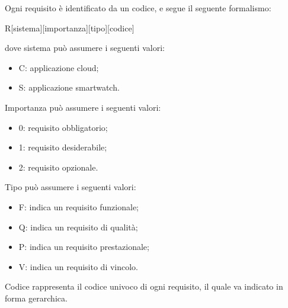 Ogni requisito è identificato da un codice, e segue il seguente formalismo:
\begin{center}
R[sistema][importanza][tipo][codice]
\end{center}
dove sistema può assumere i seguenti valori:
\begin{itemize}
\item C: applicazione cloud;
\item S: applicazione smartwatch.
\end{itemize}
Importanza può assumere i seguenti valori:
\begin{itemize}
\item 0: requisito obbligatorio;
\item 1: requisito desiderabile;
\item 2: requisito opzionale.
\end{itemize}
Tipo può assumere i seguenti valori:
\begin{itemize}
\item F: indica un requisito funzionale;
\item Q: indica un requisito di qualità;
\item P: indica un requisito prestazionale;
\item V: indica un requisito di vincolo.
\end{itemize}
Codice rappresenta il codice univoco di ogni requisito, il quale va indicato in forma gerarchica.

